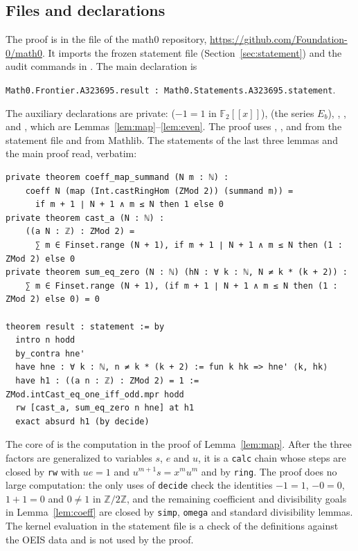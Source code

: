 \documentclass[11pt]{amsart}
\theoremstyle{plain}
\theoremstyle{definition}
\newcommand{\Z}{\mathbb{Z}}
\newcommand{\F}{\mathbb{F}_2}
\begin{document}
\subsection*{Files and declarations}
The proof is in the file  of the math0 repository, \url{https://github.com/Foundation-0/math0}. It imports the frozen statement file  (Section~\ref{sec:statement}) and the audit commands in . The main declaration is
\begin{center}
\texttt{Math0.Frontier.A323695.result :\ Math0.Statements.A323695.statement}.
\end{center}
The auxiliary declarations are private:  ($-1=1$ in $\F[[x]]$),  (the series $E_b$), , ,  and , which are Lemmas~\ref{lem:map}--\ref{lem:even}. The proof uses , ,  and  from the statement file and  from Mathlib. The statements of the last three lemmas and the main proof read, verbatim:
\begin{lstlisting}
private theorem coeff_map_summand (N m : ℕ) :
    coeff N (map (Int.castRingHom (ZMod 2)) (summand m)) =
      if m + 1 ∣ N + 1 ∧ m ≤ N then 1 else 0
private theorem cast_a (N : ℕ) :
    ((a N : ℤ) : ZMod 2) =
      ∑ m ∈ Finset.range (N + 1), if m + 1 ∣ N + 1 ∧ m ≤ N then (1 : ZMod 2) else 0
private theorem sum_eq_zero (N : ℕ) (hN : ∀ k : ℕ, N ≠ k * (k + 2)) :
    ∑ m ∈ Finset.range (N + 1), (if m + 1 ∣ N + 1 ∧ m ≤ N then (1 : ZMod 2) else 0) = 0

theorem result : statement := by
  intro n hodd
  by_contra hne'
  have hne : ∀ k : ℕ, n ≠ k * (k + 2) := fun k hk => hne' ⟨k, hk⟩
  have h1 : ((a n : ℤ) : ZMod 2) = 1 := ZMod.intCast_eq_one_iff_odd.mpr hodd
  rw [cast_a, sum_eq_zero n hne] at h1
  exact absurd h1 (by decide)
\end{lstlisting}
The core of  is the computation in the proof of Lemma~\ref{lem:map}. After the three factors are generalized to variables $s$, $e$ and $u$, it is a \texttt{calc} chain whose steps are closed by \texttt{rw} with $ue=1$ and $u^{m+1}s=x^mu^m$ and by \texttt{ring}. The proof does no large computation: the only uses of \texttt{decide} check the identities $-1=1$, $-0=0$, $1+1=0$ and $0\ne1$ in $\Z/2\Z$, and the remaining coefficient and divisibility goals in Lemma~\ref{lem:coeff} are closed by \texttt{simp}, \texttt{omega} and standard divisibility lemmas. The kernel evaluation  in the statement file is a check of the definitions against the OEIS data and is not used by the proof.
\end{document}

